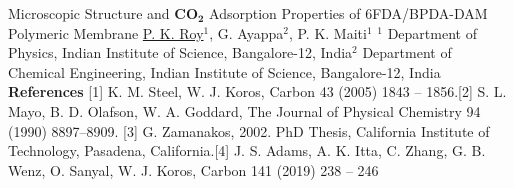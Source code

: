 \begin{abstract_online}{Microscopic Structure and $\mathbf{CO_2}$ Adsorption Properties of 6FDA/BPDA-DAM Polymeric Membrane}{%
        \underline{P. K. Roy}$^{1}$, G. Ayappa$^{2}$, P. K. Maiti$^{1}$}{%
        }{%
        $^1$ Department of Physics, Indian Institute of Science, Bangalore-12, India\newline{}$^2$ Department of Chemical Engineering, Indian Institute of Science, Bangalore-12, India}
        \textbf{References} \newline{}[1] K. M. Steel, W. J. Koros, Carbon 43 (2005) 1843 – 1856.\newline{}[2] S. L. Mayo, B. D. Olafson, W. A. Goddard, The Journal of Physical Chemistry 94 (1990) 8897–8909. \newline{}[3] G. Zamanakos, 2002. PhD Thesis, California Institute of Technology, Pasadena, California.\newline{}[4] J. S. Adams, A. K. Itta, C. Zhang, G. B. Wenz, O. Sanyal, W. J. Koros, Carbon 141 (2019) 238 – 246 
    \end{abstract_online}
    